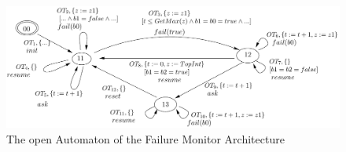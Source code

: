 \documentclass{llncs}
\begin{document}








\begin{figure}[t]
  \centering
  \includegraphics[width=0.9\columnwidth]{TimerOADetailed}
  \caption{The open Automaton of the Failure Monitor Architecture}
  \label{fig:ArchFailure:OA}
\end{figure}

\end{document}
